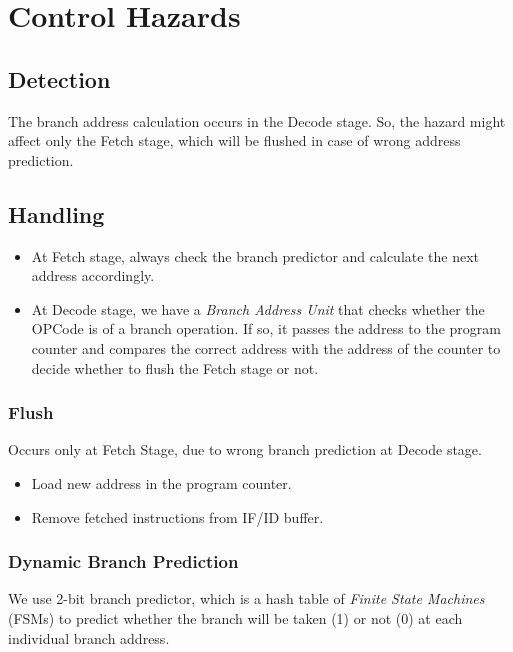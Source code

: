 \documentclass[12pt]{report}
\begin{document}
\section{Control Hazards}

\subsection{Detection}
The branch address calculation occurs in the Decode stage. So, the hazard might affect only the Fetch stage, which will be flushed in case of wrong address prediction.

\subsection{Handling}
\begin{itemize}
    \item At Fetch stage, always check the branch predictor and calculate the next address accordingly.
    \item At Decode stage, we have a \emph{Branch Address Unit} that checks whether the OPCode is of a branch operation. If so, it passes the address to the program counter and compares the correct address with the address of the counter to decide whether to flush the Fetch stage or not. 
\end{itemize}

\subsubsection{Flush}
Occurs only at Fetch Stage, due to wrong branch prediction at Decode stage.
\begin{itemize}
    \item Load new address in the program counter.
    \item Remove fetched instructions from IF/ID buffer.
\end{itemize}

\subsubsection{Dynamic Branch Prediction}
We use 2-bit branch predictor, which is a hash table of \emph{Finite State Machines} (FSMs) to predict whether the branch will be taken (1) or not (0) at each individual branch address.
\end{document}
